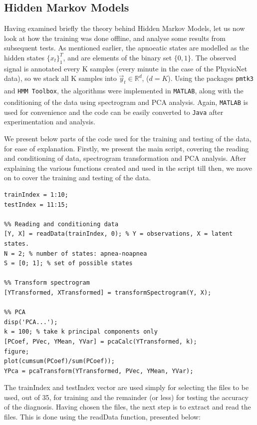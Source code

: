 \subsection{Hidden Markov Models}

Having examined briefly the theory behind Hidden Markov Models, let us now look at how the training was done offline, and analyse some results from subsequent tests. As mentioned earlier, the apnoeatic states are modelled as the hidden states $\{x_t\}_1^T$, and are elements of the binary set $\{0, 1\}$. The observed signal is annotated every K samples (every minute in the case of the PhysioNet data), so we stack all K samples into $\vec y_t \in \mathbb{R}^d$, ($d = K$). Using the packages \verb!pmtk3! and \verb!HMM Toolbox!, the algorithms were implemented in \verb!MATLAB!\textsuperscript{\textregistered}, along with the conditioning of the data using spectrogram and PCA analysis. Again, \verb!MATLAB!\textsuperscript{\textregistered} is used for convenience and the code can be easily converted to \verb!Java! after experimentation and analysis.

We present below parts of the code used for the training and testing of the data, for ease of explanation. Firstly, we present the main script, covering the reading and conditioning of data, spectrogram transformation and PCA analysis. After explaining the various functions created and used in the script till then, we move on to cover the training and testing of the data.

\begin{lstlisting}
trainIndex = 1:10;
testIndex = 11:15;

%% Reading and conditioning data
[Y, X] = readData(trainIndex, 0); % Y = observations, X = latent states.
N = 2; % number of states: apnea-noapnea
S = [0; 1]; % set of possible states

%% Transform spectrogram
[YTransformed, XTransformed] = transformSpectrogram(Y, X);

%% PCA
disp('PCA...');
k = 100; % take k principal components only
[PCoef, PVec, YMean, YVar] = pcaCalc(YTransformed, k);
figure;
plot(cumsum(PCoef)/sum(PCoef));
YPca = pcaTransform(YTransformed, PVec, YMean, YVar);
\end{lstlisting}

The trainIndex and testIndex vector are used simply for selecting the files to be used, out of 35, for training and the remainder (or less) for testing the accuracy of the diagnosis. Having chosen the files, the next step is to extract and read the files. This is done using the readData function, presented below:

